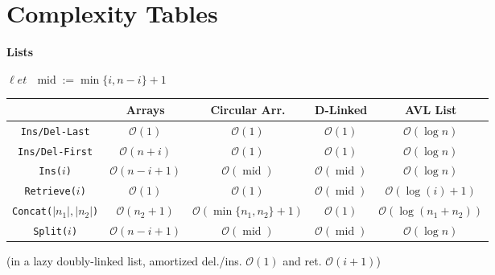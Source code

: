 \documentclass[]{article}
\newcommand\oc    {\mathcal{O}}
\newcommand\set   {\ell et \text{ }}
\newcommand\logn      {\log n}
\newcommand\sof[1]    {\left | #1 \right |}
\theoremstyle{definition}
\newcommand\regFont   {\fontsize{8}{10}\rmfamily}
\newcommand\tableFont {\fontsize{6}{7}\rmfamily}
\DeclareMathOperator{\midText}{mid}
\begin{document}
	\section{Complexity Tables}
	\vspace{-25pt}
	\begin{multicols}{2}
		{\regFont\hfil \textbf{Lists}\vspace{-3pt}}\tableFont
		
		{\hfil $\set \midText := \min\{i, n - i\} + 1$}
		\begin{center}
			\begin{tabular}{c|cccc} %
				 & \textbf{Arrays} & \textbf{Circular Arr.} & \textbf{D-Linked} & \textbf{AVL List} \\
				\hline \texttt{Ins/Del-Last} & $\oc(1)$ & $\oc(1)$ & $\oc(1)$ & $\oc(\logn)$ \\
				\hline \texttt{Ins/Del-First} & $\oc(n + i)$ & $\oc(1)$ & $\oc(1)$ & $\oc(\logn)$ \\
				\hline \texttt{Ins($i$)} & $\oc(n - i + 1)$ & $\oc(\midText)$ & $\oc(\midText)$ &$\oc(\logn)$ \\
				\hline \texttt{Retrieve($i$)} & $\oc(1)$ & $\oc(1)$ & $\oc(\midText)$ & $\oc(\log(i) + 1)$ \\
				\hline \texttt{Concat($\sof{n_1}, \sof{n_2}$)} & $\oc(n_2 + 1)$ & $\oc(\min\{n_1, n_2\} + 1) $ & $\oc(1)$ & $\oc(\log (n_1 + n_2))$ \\ 
				\hline \texttt{Split($i$)} & $\oc(n - i + 1)$ & $\oc(\midText)$ & $\oc(\midText)$ & $\oc(\logn)$
			\end{tabular}
		\end{center}
		(in a lazy doubly-linked list, amortized del./ins. $\oc(1)$ and ret. $\oc(i + 1)$)
		
		\columnbreak
		

\end{multicols}
\end{document}
